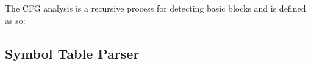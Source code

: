 The CFG analysis is a recursive process for detecting basic blocks and is defined as so:











\subsection{Symbol Table Parser}

%
%
%
%
%
%
%

